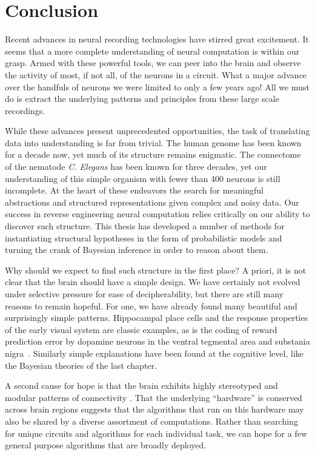 \chapter{Conclusion}
\label{conclusion}

Recent advances in neural recording technologies have stirred great
excitement. It seems that a more complete understanding of neural
computation is within our grasp. Armed with these powerful tools, we
can peer into the brain and observe the activity of most, if not all,
of the neurons in a circuit. What a major advance over the handfuls
of neurons we were limited to only a few years ago! All we must do
is extract the underlying patterns and principles from these
large scale recordings.

While these advances present unprecedented opportunities, the task
of translating data into understanding is far from trivial. The human
genome has been known for a decade now, yet much of its structure remains
enigmatic. The connectome of the nematode \textit{C. Elegans} has been
known for three decades, yet our understanding of this simple organism
with fewer than 400 neurons is still incomplete. At the heart of these
endeavors the search for meaningful abstractions and structured
representations given complex and noisy data. Our success in reverse
engineering neural computation relies critically on our ability
to discover such structure. This thesis has developed a number of methods
for instantiating structural hypotheses in the form of probabilistic
models and turning the crank of Bayesian inference in order to reason
about them.

Why should we expect to find such structure in the first place?  A
priori, it is not clear that the brain should have a simple design. We
have certainly not evolved under selective pressure for ease of
decipherability, but there are still many reasons to remain
hopeful. For one, we have already found many beautiful and
surprisingly simple patterns. Hippocampal place cells and the response
properties of the early visual system are classic examples, as is the
coding of reward prediction error by dopamine neurons in the ventral
tegmental area and substania
nigra~\citep{schultz1997neural}. Similarly simple explanations have
been found at the cognitive level, like the Bayesian theories of the
last chapter.

A second cause for hope is that the brain exhibits highly stereotyped and
modular patterns of connectivity \citep{shepherd2003synaptic}.  That
the underlying ``hardware'' is conserved across brain regions
suggests that the algorithms that run on this hardware may also be shared
by a diverse assortment of computations. Rather than searching for
unique circuits and algorithms for each individual task, we can hope for
a few general purpose algorithms that are broadly deployed.

